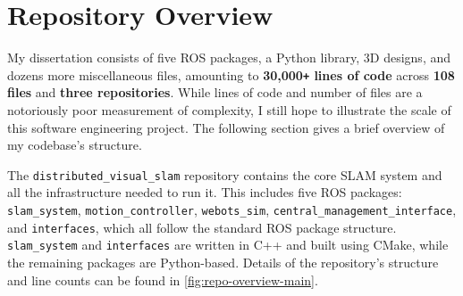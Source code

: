 \newpage
\section{Repository Overview}
\label{sec:repository-overview}

\newcommand{\locindent}{3.3em}
\newcommand{\locsmallindent}{2em}
\newcommand{\locdiff}[3]{
    \makebox[#3][r]{\textcolor{PineGreen}{\texttt{+#1}}}
    \makebox[#3][r]{\textcolor{BrickRed}{\texttt{-#2}}}
}
\newcommand{\locadd}[2]{
    \makebox[#2][r]{\textcolor{PineGreen}{\texttt{+#1}}}
    \makebox[#2][r]{}
}
\newcommand{\locaddnospace}[2]{
    \makebox[#2][r]{\textcolor{PineGreen}{\texttt{+#1}}}
}
\newcommand{\locdoublespace}[1]{
    \makebox[#1][r]{}
    \makebox[#1][r]{}
}
\newcommand{\locsinglespace}[1]{
    \makebox[#1][r]{}
}

My dissertation consists of five ROS packages, a Python library, 3D designs, and dozens more miscellaneous files, amounting to \textbf{30,000\texttt{+} lines of code} across \textbf{108 files} and \textbf{three repositories}. While lines of code and number of files are a notoriously poor measurement of complexity, I still hope to illustrate the scale of this software engineering project. The following section gives a brief overview of my codebase's structure.

The \texttt{distributed\_visual\_slam} repository contains the core SLAM system and all the infrastructure needed to run it. This includes five ROS packages: \texttt{slam\_system}, \texttt{motion\_controller}, \texttt{webots\_sim}, \texttt{central\_management\_interface}, and \texttt{interfaces}, which all follow the standard ROS package structure. \texttt{slam\_system} and \texttt{interfaces} are written in C++ and built using CMake, while the remaining packages are Python-based. Details of the repository's structure and line counts can be found in \autoref{fig:repo-overview-main}.

